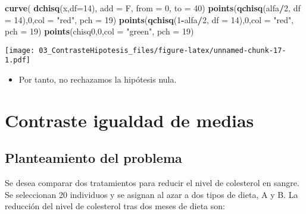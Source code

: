 \documentclass[]{article}
\newenvironment{Shaded}{\begin{snugshade}}{\end{snugshade}}
\newcommand{\KeywordTok}[1]{\textcolor[rgb]{0.13,0.29,0.53}{\textbf{#1}}}
\newcommand{\DataTypeTok}[1]{\textcolor[rgb]{0.13,0.29,0.53}{#1}}
\newcommand{\DecValTok}[1]{\textcolor[rgb]{0.00,0.00,0.81}{#1}}
\newcommand{\StringTok}[1]{\textcolor[rgb]{0.31,0.60,0.02}{#1}}
\newcommand{\OperatorTok}[1]{\textcolor[rgb]{0.81,0.36,0.00}{\textbf{#1}}}
\newcommand{\NormalTok}[1]{#1}
\providecommand{\tightlist}{%
  \setlength{\itemsep}{0pt}\setlength{\parskip}{0pt}}
\begin{document}
\begin{Shaded}
\begin{Highlighting}[]
\KeywordTok{curve}\NormalTok{( }\KeywordTok{dchisq}\NormalTok{(x,}\DataTypeTok{df=}\DecValTok{14}\NormalTok{), }\DataTypeTok{add =}\NormalTok{ F, }\DataTypeTok{from =} \DecValTok{0}\NormalTok{, }\DataTypeTok{to =} \DecValTok{40}\NormalTok{)}
\KeywordTok{points}\NormalTok{(}\KeywordTok{qchisq}\NormalTok{(alfa}\OperatorTok{/}\DecValTok{2}\NormalTok{, }\DataTypeTok{df =} \DecValTok{14}\NormalTok{),}\DecValTok{0}\NormalTok{,}\DataTypeTok{col =} \StringTok{"red"}\NormalTok{, }\DataTypeTok{pch =} \DecValTok{19}\NormalTok{)}
\KeywordTok{points}\NormalTok{(}\KeywordTok{qchisq}\NormalTok{(}\DecValTok{1}\OperatorTok{-}\NormalTok{alfa}\OperatorTok{/}\DecValTok{2}\NormalTok{, }\DataTypeTok{df =} \DecValTok{14}\NormalTok{),}\DecValTok{0}\NormalTok{,}\DataTypeTok{col =} \StringTok{"red"}\NormalTok{, }\DataTypeTok{pch =} \DecValTok{19}\NormalTok{)}
\KeywordTok{points}\NormalTok{(chisq0,}\DecValTok{0}\NormalTok{,}\DataTypeTok{col =} \StringTok{"green"}\NormalTok{, }\DataTypeTok{pch =} \DecValTok{19}\NormalTok{)}
\end{Highlighting}
\end{Shaded}

\texttt{[image: 03\_ContrasteHipotesis\_files/figure-latex/unnamed-chunk-17-1.pdf]}

\begin{itemize}
\tightlist
\item
  Por tanto, no rechazamos la hipótesis nula.
\end{itemize}

\section{Contraste igualdad de
medias}\label{contraste-igualdad-de-medias}

\subsection{Planteamiento del
problema}\label{planteamiento-del-problema-1}

Se desea comparar dos tratamientos para reducir el nivel de colesterol
en sangre. Se seleccionan 20 individuos y se asignan al azar a dos tipos
de dieta, A y B. La reducción del nivel de colesterol tras dos meses de
dieta son:
\end{document}
